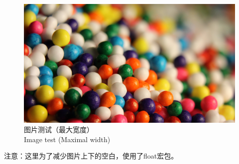 \begin{figure}[H]
    \centering
    \includegraphics[width=130mm]{./figures/figure_example1.jpg}
    \caption{图片测试（最大宽度）\\Image test (Maximal width)}
\end{figure}
\par 注意：这里为了减少图片上下的空白，使用了float宏包。